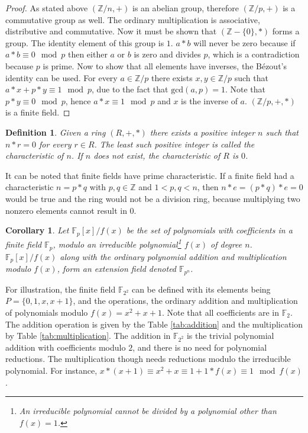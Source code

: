 \documentclass{ufsctex/ufsctex}
\newtheorem{definition}{Definition}
\newtheorem{corollary}{Corollary}
\begin{document}
\begin{proof}
As stated above $(\mathbb{Z}/n, +)$ is an abelian group, therefore
$(\mathbb{Z}/p, +)$ is a commutative group as well. The ordinary multiplication
is associative, distributive and commutative. Now it must be shown that
$(\mathbb{Z} - \{0\}, *)$ forms a group. The identity element of this group is
$1$. $a*b$ will never be zero because if $a*b \equiv 0 \mod p$ then either $a$
or $b$ is zero and divides $p$, which is a contradiction because $p$ is prime.
Now to show that all elements have inverses, the Bézout's identity can be used.
For every $a \in \mathbb{Z}/p$ there exists $x, y \in \mathbb{Z}/p$ such that
$a*x + p*y \equiv 1 \mod p$, due to the fact that $\text{gcd}(a, p) = 1$. Note
that $p*y \equiv 0 \mod p$, hence $a*x \equiv 1 \mod p$ and $x$ is the inverse
of $a$. $(\mathbb{Z}/p, +, *)$ is a finite field.
\end{proof}

\begin{definition}
Given a ring $(R, +, *)$ there exists a positive integer $n$ such that $n*r =
0$ for every $r \in R$. The least such positive integer is called the
characteristic of $n$. If $n$ does not exist, the characteristic of $R$ is $0$.
\end{definition}

It can be noted that finite fields have prime characteristic. If a finite field
had a characteristic $n = p*q$ with $p, q \in \mathbb{Z}$ and $1 < p,q < n$,
then $n*e = (p*q)*e = 0$ would be true and the ring would not be a division
ring, because multiplying two nonzero elements cannot result in $0$.

\begin{corollary}\label{cor:extension}
Let $\mathbb{F}_p[x]/f(x)$ be the set of polynomials with coefficients in a
finite field $\mathbb{F}_p$, modulo an irreducible polynomial\footnote{An
irreducible polynomial cannot be divided by a polynomial other than $f(x) =
1$.} $f(x)$ of degree $n$. $\mathbb{F}_p[x]/f(x)$ along with the ordinary
polynomial addition and multiplication modulo $f(x)$, form an extension field
denoted $\mathbb{F}_{p^n}$.
\end{corollary}

For illustration, the finite field $\mathbb{F}_{2^2}$ can be defined with its
elements being $P = \{0, 1, x, x+1\}$, and the operations, the ordinary
addition and multiplication of polynomials modulo $f(x) = x^2 + x + 1$. Note
that all coefficients are in $\mathbb{F}_2$. The addition operation is given by
the Table \ref{tab:addition} and the multiplication by Table
\ref{tab:multiplication}. The addition in $\mathbb{F}_{2^2}$ is the trivial
polynomial addition with coefficients modulo $2$, and there is no need for
polynomial reductions. The multiplication though needs reductions modulo the
irreducible polynomial. For instance, $x*(x+1) \equiv x^2+x \equiv 1 + 1*f(x)
\equiv 1 \mod f(x)$.
\end{document}
